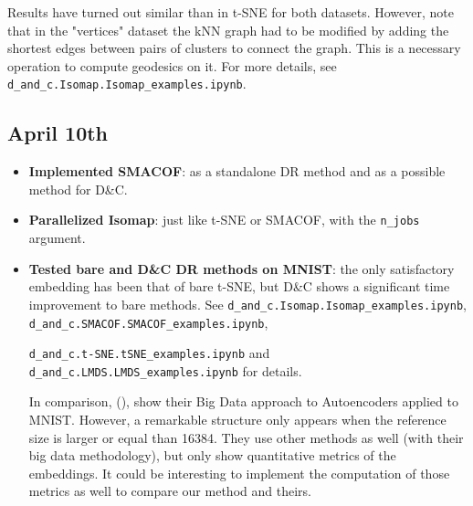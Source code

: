 \documentclass[a4paper,12pt]{article}
\begin{document}
\begin{itemize}
    Results have turned out similar than in t-SNE for both datasets. However, note that in the "vertices" dataset the kNN graph had to be modified by adding the shortest edges between pairs of clusters to connect the graph. This is a necessary operation to compute geodesics on it. For more details, see \verb|d_and_c.Isomap.Isomap_examples.ipynb|.
\end{itemize}

\subsection{April 10th}
\begin{itemize}
    \item \textbf{Implemented SMACOF}: as a standalone DR method and as a possible method for D\&C.
    \item \textbf{Parallelized Isomap}: just like t-SNE or SMACOF, with the \verb|n_jobs| argument.
    \item \textbf{Tested bare and D\&C DR methods on MNIST}: the only satisfactory embedding has been that of bare t-SNE, but D\&C shows a significant time improvement to bare methods. See \verb|d_and_c.Isomap.Isomap_examples.ipynb|, \verb|d_and_c.SMACOF.SMACOF_examples.ipynb|,
    
    \verb|d_and_c.t-SNE.tSNE_examples.ipynb| and \verb|d_and_c.LMDS.LMDS_examples.ipynb| for details.

    In comparison, (\cite{Reichmann2024}), show their Big Data approach to Autoencoders applied to MNIST. However, a remarkable structure only appears when the reference size is larger or equal than 16384. They use other methods as well (with their big data methodology), but only show quantitative metrics of the embeddings. It could be interesting to implement the computation of those metrics as well to compare our method and theirs.
\end{itemize}
\end{document}
